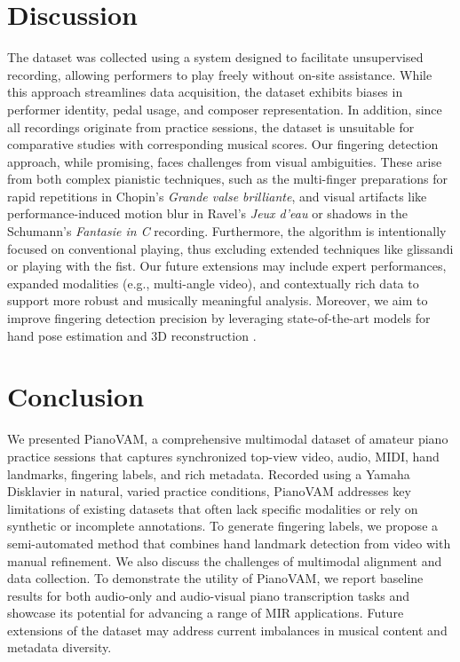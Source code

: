 \documentclass{article}
\begin{document}
\section{Discussion}\label{sec:discussion}
The dataset was collected using a system designed to facilitate unsupervised recording, allowing performers to play freely without on-site assistance. While this approach streamlines data acquisition, the dataset exhibits biases in performer identity, pedal usage, and composer representation. In addition, since all recordings originate from practice sessions, the dataset is unsuitable for comparative studies with corresponding musical scores. Our fingering detection approach, while promising, faces challenges from visual ambiguities. These arise from both complex pianistic techniques, such as the multi-finger preparations for rapid repetitions in Chopin's \textit{Grande valse brilliante}, and visual artifacts like performance-induced motion blur in Ravel's \textit{Jeux d'eau} or shadows in the Schumann's \textit{Fantasie in C} recording. Furthermore, the algorithm is intentionally focused on conventional playing, thus excluding extended techniques like glissandi or playing with the fist. Our future extensions may include expert performances, expanded modalities (e.g., multi-angle video), and contextually rich data to support more robust and musically meaningful analysis. Moreover, we aim to improve fingering detection precision by leveraging state-of-the-art models for hand pose estimation \cite{ViTPose++} and 3D reconstruction \cite{dong2024hamba}. %

\section{Conclusion}\label{sec:conclusion}
We presented PianoVAM, a comprehensive multimodal dataset of amateur piano practice sessions that captures synchronized top-view video, audio, MIDI, hand landmarks, fingering labels, and rich metadata. Recorded using a Yamaha Disklavier in natural, varied practice conditions, PianoVAM addresses key limitations of existing datasets that often lack specific modalities or rely on synthetic or incomplete annotations. To generate fingering labels, we propose a semi-automated method that combines hand landmark detection from video with manual refinement. We also discuss the challenges of multimodal alignment and data collection. To demonstrate the utility of PianoVAM, we report baseline results for both audio-only and audio-visual piano transcription tasks and showcase its potential for advancing a range of MIR applications. Future extensions of the dataset may address current imbalances in musical content and metadata diversity.
\end{document}
